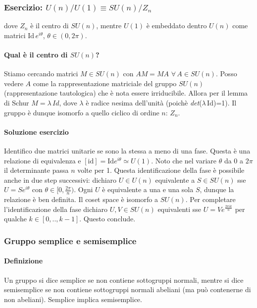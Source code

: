 \documentclass[12pt,oneside,notitlepage,abstracton,a4paper]{scrartcl}
\begin{document}
\subsubsection{Esercizio: $U(n)/U(1) \equiv SU(n)/Z_n$}
dove $Z_n$ è il centro di $SU(n)$, mentre $U(1)$ è embeddato dentro $U(n)$ come matrici $\mathrm{Id}\, e^{i\theta}$, $\theta\in (0,2\pi)$.

\paragraph{Qual è il centro di $SU(n)$?} Stiamo cercando matrici $M\in SU(n)$ con $AM = MA$ $\forall\,A \in SU(n)$. Posso vedere $A$ come la rappresentazione matriciale del gruppo $SU(n)$ (rappresentazione tautologica) che è nota essere irriducibile. Allora per il lemma di Schur $M= \lambda\, Id$, dove $\lambda$ è radice $n$esima dell'unità (poichè \emph{det}($\lambda\,\mathrm{Id}$)=1). Il gruppo è dunque isomorfo a quello ciclico di ordine $n$: $Z_n$.

\paragraph{Soluzione esercizio} Identifico due matrici unitarie se sono la stessa a meno di una fase. Questa è una relazione di equivalenza e $[\mathrm{id}] = \mathrm{Id} e^{i\theta}\simeq U(1)$. Noto che nel variare $\theta$ da 0 a $2\pi$ il determinante passa $n$ volte per 1. Questa identificazione della fase è possibile anche in due step successivi: dichiaro $U\in U(n)$ equivalente a $S\in SU(n)$ sse $U=S e^{i\theta}$ con $\theta \in [0,\frac{2\pi}{n})$. Ogni $U$ è equivalente a una e una sola $S$, dunque la relazione è ben definita. Il coset space è isomorfo a $SU(n)$. Per completare l'identificazione della fase dichiaro $U,V\in SU(n)$ equivalenti sse $U=V e^{\frac{2\pi i k}{n}}$ per qualche $k\in[0,..,k-1]$. Questo conclude.

\subsubsection{Gruppo semplice e semisemplice}
\paragraph{Definizione} Un gruppo si dice semplice se non contiene sottogruppi normali, mentre si dice semisemplice se non contiene sottogruppi normali abeliani (ma può contenerne di non abeliani). Semplice implica semisemplice.
\end{document}
